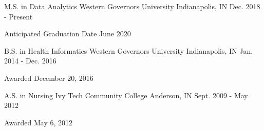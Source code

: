 
\begin{cventries}

  \cventry
    {M.S. in Data Analytics} %
    {Western Governors University} %
    {Indianapolis, IN} %
    {Dec. 2018 - Present} %
    {
      \begin{cvitems} %
        \item {Anticipated Graduation Date June 2020}
      \end{cvitems}
    }

  \cventry
    {B.S. in Health Informatics} %
    {Western Governors University} %
    {Indianapolis, IN} %
    {Jan. 2014 - Dec. 2016} %
    {
      \begin{cvitems} %
        \item {Awarded December 20, 2016}
      \end{cvitems}
    }


  \cventry
    {A.S. in Nursing} %
    {Ivy Tech Community College} %
    {Anderson, IN} %
    {Sept. 2009 - May 2012} %
    {
      \begin{cvitems} %
        \item {Awarded May 6, 2012}
      \end{cvitems}
    }

\end{cventries}
\newpage
